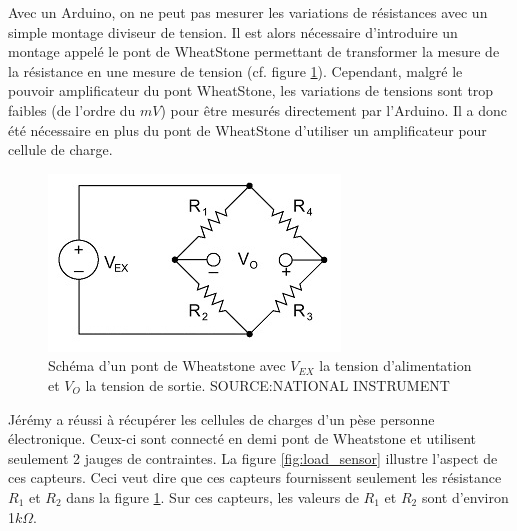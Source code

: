 \documentclass{polytech/polytech}
\begin{document}
Avec un Arduino, on ne peut pas mesurer les variations de résistances avec un simple montage diviseur de tension. Il est alors nécessaire d'introduire un montage appelé le pont de WheatStone permettant de transformer la mesure de la résistance en une mesure de tension (cf. figure \ref{fig:wheatstone_bridge}). Cependant, malgré le pouvoir amplificateur
du pont WheatStone, les variations de tensions sont trop faibles (de l'ordre du $mV$) pour être mesurés directement par l'Arduino. Il a donc été nécessaire en plus du pont de WheatStone d'utiliser un amplificateur pour cellule de charge.

\begin{figure}
\begin{center}
\includegraphics[scale=1]{image/wheatstone_bridge.jpg}
\end{center}
\caption{Schéma d'un pont de Wheatstone avec $V_{EX}$ la tension d'alimentation et $V_O$ la tension de sortie. SOURCE:NATIONAL INSTRUMENT}
\label{fig:wheatstone_bridge}
\end{figure}

Jérémy a réussi à récupérer les cellules de charges d'un pèse personne électronique. Ceux-ci sont connecté en demi pont de Wheatstone et utilisent seulement 2 jauges de contraintes. La figure \ref{fig:load_sensor} illustre l'aspect de ces capteurs. Ceci veut dire que ces capteurs fournissent seulement les résistance $R_1$ et $R_2$ dans la figure \ref{fig:wheatstone_bridge}. Sur ces capteurs, les valeurs  de $R_1$ et $R_2$ sont d'environ 1$k\Omega$.
\end{document}
